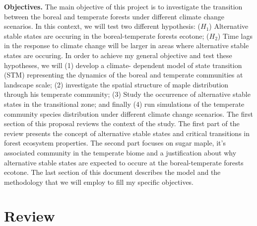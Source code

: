 \textbf{Objectives.} The main objective of this project is to investigate the
transition between the boreal and temperate forests under different climate
change scenarios. In this context, we will test two different hypothesis:
($H_1$) Alternative stable states are occuring in the boreal-temperate forests
ecotone;  ($H_2$) Time lags in the response to climate change will be larger
in areas where alternative stable states are occuring. In order to achieve my
general objective and test these hypotheses, we will (1) develop a climate-
dependent model of state transition (STM) representing the dynamics of the
boreal and temperate communities at landscape scale; (2) investigate the
spatial structure of maple distribution through his temperate community; (3)
Study the occurrence of alternative stable states in the transitional zone;
and finally (4) run simulations of the temperate community species
distribution under different climate change scenarios. The first section of
this proposal reviews the context of the study. The first part of the review
presents the concept of alternative stable states and critical transitions in
forest ecosystem properties. The second part focuses on sugar maple, it's
associated community in the temperate biome and a justification about why
alternative stable states are expected to occure at the boreal-temperate
forests ecotone. The last section of this document describes the model and
the methodology that we will employ to fill my specific objectives. 

\section{Review} 

